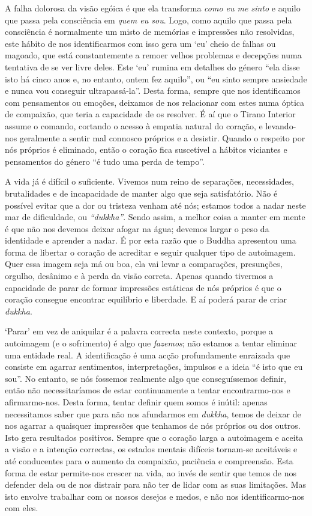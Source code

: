 A falha dolorosa da visão egóica é que ela transforma \emph{como eu me
sinto} e aquilo que passa pela consciência em \emph{quem eu sou}. Logo,
como aquilo que passa pela consciência é normalmente um misto de
memórias e impressões não resolvidas, este hábito de nos identificarmos
com isso gera um `eu' cheio de falhas ou magoado, que está
constantemente a remoer velhos problemas e decepções numa tentativa de
se ver livre deles. Este `eu' rumina em detalhes do género “ela disse
isto há cinco anos e, no entanto, ontem fez aquilo”, ou “eu sinto sempre
ansiedade e nunca vou conseguir ultrapassá-la”. Desta forma, sempre que
nos identificamos com pensamentos ou emoções, deixamos de nos relacionar
com estes numa óptica de compaixão, que teria a capacidade de os
resolver. É aí que o Tirano Interior assume o comando, cortando o acesso
à empatia natural do coração, e levando-nos geralmente a sentir mal
connosco próprios e a desistir. Quando o respeito por nós próprios é
eliminado, então o coração fica suscetível a hábitos viciantes e
pensamentos do género “é tudo uma perda de tempo”.

A vida já é difícil o suficiente. Vivemos num reino de separações,
necessidades, brutalidades e de incapacidade de manter algo que seja
satisfatório. Não é possível evitar que a dor ou tristeza venham até
nós; estamos todos a nadar neste mar de dificuldade, ou \emph{“dukkha”}.
Sendo assim, a melhor coisa a manter em mente é que não nos devemos
deixar afogar na água; devemos largar o peso da identidade e aprender a
nadar. É por esta razão que o Buddha apresentou uma forma de libertar o
coração de acreditar e seguir qualquer tipo de autoimagem. Quer essa
imagem seja má ou boa, ela vai levar a comparações, presunções, orgulho,
desânimo e à perda da visão correta. Apenas quando tivermos a capacidade
de parar de formar impressões estáticas de nós próprios é que o coração
consegue encontrar equilíbrio e liberdade. E aí poderá parar de criar
\emph{dukkha}.

`Parar' em vez de aniquilar é a palavra correcta neste contexto, porque
a autoimagem (e o sofrimento) é algo que \emph{fazemos}; não estamos a
tentar eliminar uma entidade real. A identificação é uma acção
profundamente enraizada que consiste em agarrar sentimentos,
interpretações, impulsos e a ideia “é isto que eu sou”. No entanto, se
nós fossemos realmente algo que conseguíssemos definir, então não
necessitaríamos de estar continuamente a tentar encontrarmo-nos e
afirmarmo-nos. Desta forma, tentar definir quem somos é inútil: apenas
necessitamos saber que para não nos afundarmos em \emph{dukkha}, temos
de deixar de nos agarrar a quaisquer impressões que tenhamos de nós
próprios ou dos outros. Isto gera resultados positivos. Sempre que o
coração larga a autoimagem e aceita a visão e a intenção correctas, os
estados mentais difíceis tornam-se aceitáveis e até conducentes para o
aumento da compaixão, paciência e compreensão. Esta forma de estar
permite-nos crescer na vida, ao invés de sentir que temos de nos
defender dela ou de nos distrair para não ter de lidar com as suas
limitações. Mas isto envolve trabalhar com os nossos desejos e medos, e
não nos identificarmo-nos com eles.

